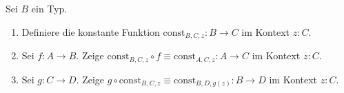 \documentclass{uebung}
\begin{document}
\begin{exercise}
  Sei $B$ ein Typ.
  \begin{enumerate}
    \item Definiere die konstante Funktion $\mathrm{const}_{B,C,z}:B\to C$ im Kontext $z:C$.
    \item Sei $f:A\to B$.
      Zeige $\mathrm{const}_{B,C,z}\circ f \equiv \mathrm{const}_{A,C,z}:A\to C$ im Kontext $z:C$.
    \item Sei $g:C\to D$.
      Zeige $g\circ\mathrm{const}_{B,C,z} \equiv \mathrm{const}_{B,D,g(z)}:B\to D$ im Kontext $z:C$.
  \end{enumerate}
\end{exercise}
\end{document}
